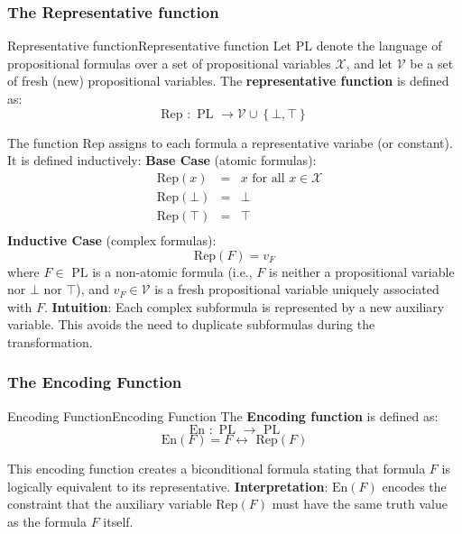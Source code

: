 \documentclass[a4paper]{article}
\theoremstyle{definition}
\begin{document}
\subsubsection{The Representative function}
\begin{definition}{Representative function}{Representative function}
Let PL denote the language of propositional formulas over a set of propositional variables \( \mathcal{X} \), and 
let \( \mathcal{V} \) be a set of fresh (new) propositional variables. The \textbf{representative function} is defined as:
\[
  \text{Rep } : \text{ PL } \rightarrow \mathcal{V} \cup \left\{ \bot, \top \right\}
\]
\end{definition}
The function Rep assigns to each formula a representative variabe (or constant). It is defined inductively:
\vspace{1em}
\noindent
\newline
\textbf{Base Case} (atomic formulas):
\begin{align*}
    & \text{Rep}(x) & = & x \text{ for all } x \in \mathcal{X} \\
    & \text{Rep}(\bot) & = & \bot \\
    & \text{Rep}(\top) & = & \top \\
\end{align*}
\textbf{Inductive Case} (complex formulas):
\[
  \text{Rep}(F) = v_{F}
\]
where \( F \in \text{ PL} \) is a non-atomic formula (i.e., \( F \) is neither a propositional variable nor \( \bot \) nor \( \top \)),
and \( v_F \in \mathcal{V} \) is a fresh propositional variable uniquely associated with $F$.
\vspace{1em}
\noindent
\newline
\textbf{Intuition}: Each complex subformula is represented by a new auxiliary variable. This avoids the need 
to duplicate subformulas during the transformation.
\subsubsection{The Encoding Function}
\begin{definition}{Encoding Function}{Encoding Function}
The \textbf{Encoding function} is defined as:
\[
  \text{En } : \text{ PL } \rightarrow \text{ PL}
\]
\[
  \text{En}(F) = F \leftrightarrow \text{ Rep}(F)
\]
\end{definition} 
This encoding function creates a biconditional formula stating that formula \( F \) is logically equivalent to its 
representative.
\vspace{1em}
\noindent
\newline
\textbf{Interpretation}: \( \text{En}(F) \) encodes the constraint that the auxiliary variable \( \text{Rep}(F) \) must have the same 
truth value as the formula \( F \) itself.
\end{document}
